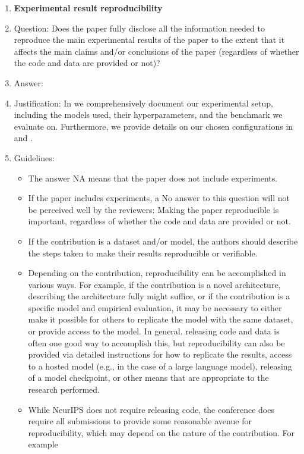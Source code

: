 \documentclass{article}
\begin{document}
\begin{enumerate}
    \item {\bf Experimental result reproducibility}
    \item[] Question: Does the paper fully disclose all the information needed to reproduce the main experimental results of the paper to the extent that it affects the main claims and/or conclusions of the paper (regardless of whether the code and data are provided or not)?
    \item[] Answer: \answerYes{} %
    \item[] Justification: In  we comprehensively document our experimental setup, including the models used, their hyperparameters, and the benchmark we evaluate on. Furthermore, we provide details on our chosen configurations in  and .
    \item[] Guidelines:
    \begin{itemize}
        \item The answer NA means that the paper does not include experiments.
        \item If the paper includes experiments, a No answer to this question will not be perceived well by the reviewers: Making the paper reproducible is important, regardless of whether the code and data are provided or not.
        \item If the contribution is a dataset and/or model, the authors should describe the steps taken to make their results reproducible or verifiable. 
        \item Depending on the contribution, reproducibility can be accomplished in various ways. For example, if the contribution is a novel architecture, describing the architecture fully might suffice, or if the contribution is a specific model and empirical evaluation, it may be necessary to either make it possible for others to replicate the model with the same dataset, or provide access to the model. In general. releasing code and data is often one good way to accomplish this, but reproducibility can also be provided via detailed instructions for how to replicate the results, access to a hosted model (e.g., in the case of a large language model), releasing of a model checkpoint, or other means that are appropriate to the research performed.
        \item While NeurIPS does not require releasing code, the conference does require all submissions to provide some reasonable avenue for reproducibility, which may depend on the nature of the contribution. For example

\end{itemize}
\end{enumerate}
\end{document}
